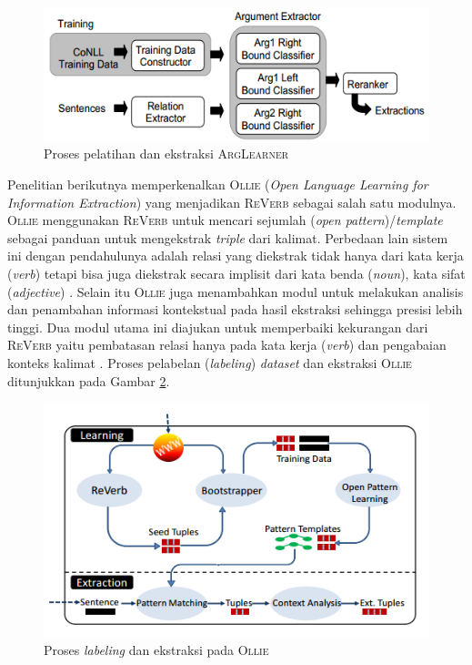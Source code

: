 \begin{figure}
	\centering
	\includegraphics[scale=0.5]{../images/arglearner_architecture.png}
	\caption{Proses pelatihan dan ekstraksi \textsc{ArgLearner}}
	\label{fig:arglearner_architecture}
\end{figure}

Penelitian berikutnya memperkenalkan \textsc{Ollie} (\textit{Open Language Learning for Information Extraction}) \citep{schmitz2012open} yang menjadikan \textsc{ReVerb} sebagai salah satu modulnya. \textsc{Ollie} menggunakan \textsc{ReVerb} untuk mencari sejumlah (\textit{open pattern})/\textit{template} sebagai panduan untuk mengekstrak \textit{triple} dari kalimat. Perbedaan lain sistem ini dengan pendahulunya adalah relasi yang diekstrak tidak hanya dari kata kerja (\textit{verb}) tetapi bisa juga diekstrak secara implisit dari kata benda (\textit{noun}), kata sifat (\textit{adjective}) \citep{schmitz2012open}. Selain itu \textsc{Ollie} juga menambahkan modul untuk melakukan analisis dan penambahan informasi kontekstual pada hasil ekstraksi sehingga presisi lebih tinggi. Dua modul utama ini diajukan untuk memperbaiki kekurangan dari \textsc{ReVerb} yaitu pembatasan relasi hanya pada kata kerja (\textit{verb}) dan pengabaian konteks kalimat \citep{schmitz2012open}. Proses pelabelan (\textit{labeling}) \textit{dataset} dan ekstraksi \textsc{Ollie} ditunjukkan pada Gambar \ref{fig:ollie_architecture}.

\begin{figure}
	\centering
	\includegraphics[scale=0.5]{../images/ollie_architecture.png}
	\caption{Proses \textit{labeling} dan ekstraksi pada \textsc{Ollie}}
	\label{fig:ollie_architecture}
\end{figure}

